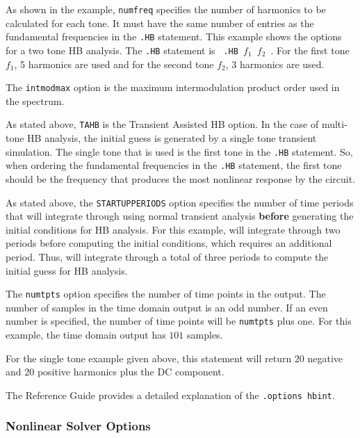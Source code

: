 As shown in the example, \texttt{numfreq} specifies the number of harmonics to
be calculated for each tone. It must have the same number of entries as the fundamental
frequencies in the \verb|.HB| statement.
This example shows the options for a two tone HB analysis.  The \verb|.HB| statement is
\texttt{ .HB $f_1$ $f_2$ }. For the first tone $f_1$, 5 harmonics are used and for the
second tone $f_2$, 3 harmonics are used.

The \texttt{intmodmax} option is the maximum intermodulation product order used
in the spectrum.

As stated above, \texttt{TAHB} is the Transient Assisted HB option. In the case
of multi-tone HB analysis, the initial guess is generated by a single tone transient simulation.
The single tone that is used is the first tone in the \verb|.HB| statement.
So, when ordering the fundamental frequencies in the \verb|.HB| statement, the first tone 
should be the frequency that produces the most nonlinear response by the circuit.  

As stated above, the \texttt{STARTUPPERIODS} option specifies the number of time periods 
that \Xyce{} will integrate through using normal transient analysis \textbf{before} 
generating the initial conditions for HB analysis.  For this example, \Xyce{} will 
integrate through two periods before computing the initial conditions, which requires 
an additional period.  Thus, \Xyce{} will integrate through a total of three periods 
to compute the initial guess for HB analysis.

The \texttt{numtpts} option specifies the number of time points in the output. The number of samples in the time domain output is an odd number. If an even number is specified, the number of time points will be \texttt{numtpts} plus one. For this example, the time domain output has $101$ samples.


For the single tone example given above, this statement will return $20$ negative and $20$ positive
harmonics plus the DC component.

The \Xyce{} Reference Guide\ReferenceGuide{} provides a detailed explanation of
the \verb|.options hbint|.

\subsubsection{Nonlinear Solver Options}

